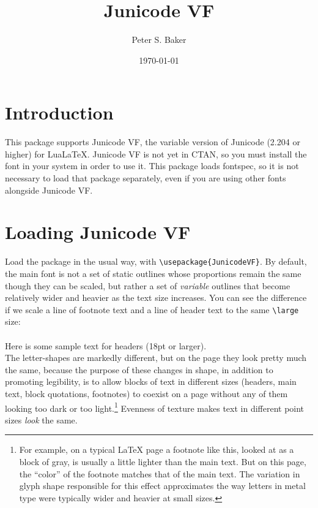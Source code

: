 \documentclass[12pt]{article}
\title{Junicode VF}
\author{Peter S. Baker}
\date{\today}
\newcommand{\lltech}{Lua\LaTeX}
\newcommand{\fspec}{{\sffamily fontspec}}
\begin{document}
\maketitle

\section{Introduction}

This package supports Junicode VF, the variable version of Junicode
(2.204 or higher) for \lltech. Junicode VF is not yet in CTAN, so you must
install the font in your system in order to use it. This package loads
\fspec, so it is not necessary to load that package separately, even if you are using
other fonts alongside Junicode VF.

\section{Loading Junicode VF}

Load the package in the usual way, with {\verb|\usepackage{JunicodeVF}|}.
By default, the main font is not a set of static outlines whose proportions
remain the same though they can be scaled, but rather a set of
\emph{variable} outlines that become relatively wider and heavier as the
text size increases. You can see the difference if we scale a line of footnote
text and a line of header text to the same {\verb|\large|} size:\\[0.5ex]

\\[0.2ex]
{\large\sampleheader Here is some sample text for headers (18pt or larger).}\\[0.5ex]

\noindent The letter-shapes are markedly different, but on the page they look
pretty much the same, because the purpose of these changes in
shape, in addition to promoting legibility,
is to allow blocks of text in different sizes (headers, main text,
block quotations, footnotes) to coexist on a page without any of them looking too
dark or too light.\footnote{%
For example, on a typical LaTeX page a footnote like this, looked at as a block
of gray, is usually a little lighter than the main text. But on this page, the
“color” of the footnote matches that of the main text. The variation in glyph
shape responsible for this effect approximates the way letters in metal type were
typically wider and heavier at small sizes.} Evenness of texture makes text in
different point sizes \emph{look} the same.
\end{document}
